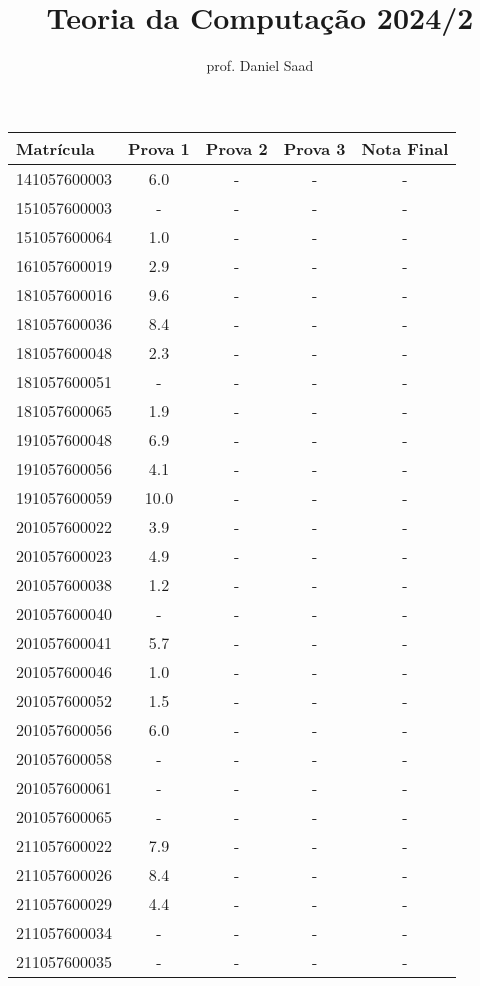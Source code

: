 \documentclass{article}
\title{ Teoria da Computação 2024/2}
\date{}
\author{ prof. Daniel Saad}
\begin{document}
 \maketitle
    \begin{longtable}{|l|c|c|c|c|}
    \hline
Matrícula & Prova 1 & Prova 2 & Prova 3 & Nota Final\\\hline \endhead   
141057600003 & 6.0 & - & - & -\\\hline
151057600003 & - & - & - & -\\\hline
151057600064 & 1.0 & - & - & -\\\hline
161057600019 & 2.9 & - & - & -\\\hline
181057600016 & 9.6 & - & - & -\\\hline
181057600036 & 8.4 & - & - & -\\\hline
181057600048 & 2.3 & - & - & -\\\hline
181057600051 & - & - & - & -\\\hline
181057600065 & 1.9 & - & - & -\\\hline
191057600048 & 6.9 & - & - & -\\\hline
191057600056 & 4.1 & - & - & -\\\hline
191057600059 & 10.0 & - & - & -\\\hline
201057600022 & 3.9 & - & - & -\\\hline
201057600023 & 4.9 & - & - & -\\\hline
201057600038 & 1.2 & - & - & -\\\hline
201057600040 & - & - & - & -\\\hline
201057600041 & 5.7 & - & - & -\\\hline
201057600046 & 1.0 & - & - & -\\\hline
201057600052 & 1.5 & - & - & -\\\hline
201057600056 & 6.0 & - & - & -\\\hline
201057600058 & - & - & - & -\\\hline
201057600061 & - & - & - & -\\\hline
201057600065 & - & - & - & -\\\hline
211057600022 & 7.9 & - & - & -\\\hline
211057600026 & 8.4 & - & - & -\\\hline
211057600029 & 4.4 & - & - & -\\\hline
211057600034 & - & - & - & -\\\hline
211057600035 & - & - & - & -\\\hline

\end{longtable}
\end{document}
